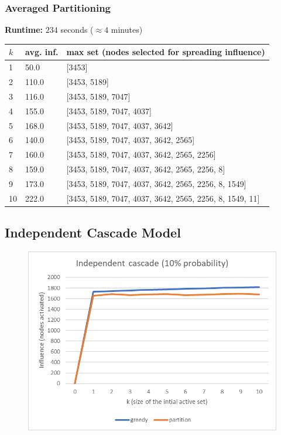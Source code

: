 \documentclass{article}
\begin{document}
    \pagebreak
    \subsubsection{Averaged Partitioning}
      
      \textbf{Runtime:} $234$ seconds ($\approx 4$ minutes)

      \begin{center}
        \begin{tabular}{|lll|}
          \hline
          $k$ & avg. inf. & max set (nodes selected for spreading influence) \\
          \hline
          1  & 50.0  & [3453] \\
          2  & 110.0 & [3453, 5189] \\
          3  & 116.0 & [3453, 5189, 7047] \\
          4  & 155.0 & [3453, 5189, 7047, 4037] \\
          5  & 168.0 & [3453, 5189, 7047, 4037, 3642] \\
          6  & 140.0 & [3453, 5189, 7047, 4037, 3642, 2565] \\
          7  & 160.0 & [3453, 5189, 7047, 4037, 3642, 2565, 2256] \\
          8  & 159.0 & [3453, 5189, 7047, 4037, 3642, 2565, 2256, 8] \\
          9  & 173.0 & [3453, 5189, 7047, 4037, 3642, 2565, 2256, 8, 1549] \\
          10 & 222.0 & [3453, 5189, 7047, 4037, 3642, 2565, 2256, 8, 1549, 11] \\
          \hline
        \end{tabular}
      \end{center}
    
  \subsection{Independent Cascade Model}
  
    \begin{figure}[h]
      \includegraphics{cascade}
      \centering
    \end{figure}
    
\end{document}

